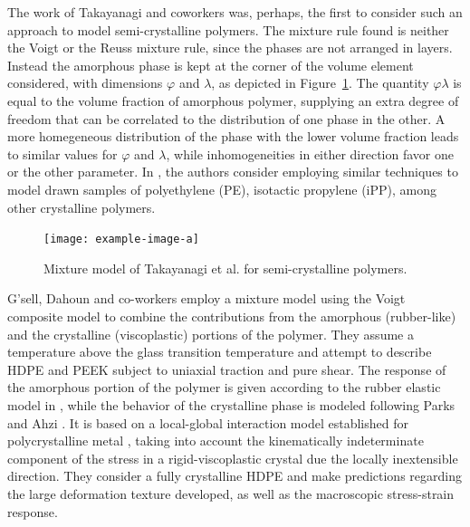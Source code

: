The work of Takayanagi and coworkers \citep{ takayanagiApplicationEquivalentModel1964} was, perhaps, the first to consider such an approach to model semi-crystalline polymers.
The mixture rule found is neither the Voigt or the Reuss mixture rule, since the phases are not arranged in layers.
Instead the amorphous phase is kept at the corner of the volume element considered, with dimensions $\varphi$ and $\lambda$, as depicted in Figure~\ref{fig:model_takayanagi}.
The quantity $\varphi \lambda$ is equal to the volume fraction of amorphous polymer, supplying an extra degree of freedom that can be correlated to the distribution of one phase in the other.
A more homegeneous distribution of the phase with the lower volume fraction leads to similar values for $\varphi$ and $\lambda$, while inhomogeneities in either direction favor one or the other parameter.
In \cite{takayanagiMechanicalPropertiesFine1967}, the authors consider employing similar techniques to model drawn samples of polyethylene (PE), isotactic propylene (iPP), among other crystalline polymers.
\begin{figure}
	\centering
	\texttt{[image: example-image-a]}
	\caption{Mixture model of Takayanagi et al. \citep{takayanagiApplicationEquivalentModel1964} for semi-crystalline polymers.}
\label{fig:model_takayanagi}
\end{figure}

G'sell, Dahoun and co-workers \citep{gsellEvolutionMicrostructureSemicrystalline1994, dahounPlasticBehaviorDeformation1995} employ a mixture model using the Voigt composite model to combine the contributions from the amorphous (rubber-like) and the crystalline (viscoplastic) portions of the polymer.
They assume a temperature above the glass transition temperature and attempt to describe HDPE and PEEK subject to uniaxial traction and pure shear.
The response of the amorphous portion of the polymer is given according to the rubber elastic model in \citep{wuImprovedNetworkModels1993}, while the behavior of the crystalline phase is modeled following Parks and Ahzi \citep{parksPolycrystallinePlasticDeformation1990}.
It is based on a local-global interaction model established for polycrystalline metal \citep{molinariSelfConsistentApproach1987}, taking into account the kinematically indeterminate component of the stress in a rigid-viscoplastic crystal due the locally inextensible direction.
They consider a fully crystalline HDPE and make predictions regarding the large deformation texture developed, as well as the macroscopic stress-strain response.

